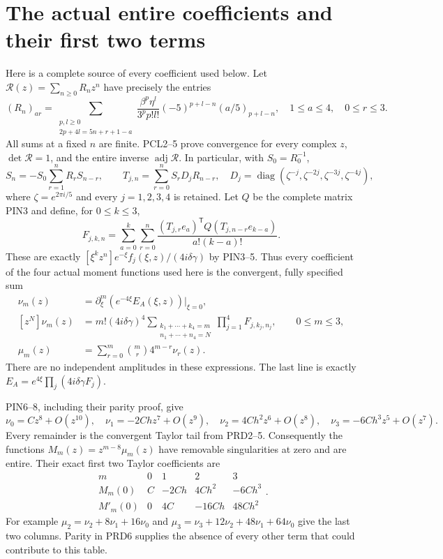 \section{The actual entire coefficients and their first two terms}
Here is a complete source of every coefficient used below. Let
$\mathcal R(z)=\sum_{n\ge0}R_nz^n$ have precisely the entries
\[
 (R_n)_{a r}=
 \sum_{\substack{p,l\ge0\\2p+4l=5n+r+1-a}}
 \frac{\beta^p\eta^l}{3^p p!l!}
 (-5)^{p+l-n}(a/5)_{p+l-n},
 \quad 1\le a\le4,\quad0\le r\le3.
 \tag{PRD2}
\]
All sums at a fixed $n$ are finite. PCL2--5 prove convergence
for every complex $z$, $\det\mathcal R=1$, and the entire
inverse $\operatorname{adj}\mathcal R$. In particular, with
$S_0=R_0^{-1}$,
\[
 S_n=-S_0\sum_{r=1}^nR_rS_{n-r},\qquad
 T_{j,n}=\sum_{r=0}^nS_rD_jR_{n-r},\quad
 D_j=\operatorname{diag}(\zeta^{-j},\zeta^{-2j},
                           \zeta^{-3j},\zeta^{-4j}),
 \tag{PRD3}
\]
where $\zeta=e^{2\pi i/5}$ and every $j=1,2,3,4$ is retained.
Let $Q$ be the complete matrix PIN3 and define, for $0\le k\le3$,
\[
 F_{j,k,n}=
 \sum_{a=0}^k\sum_{r=0}^n
 \frac{(T_{j,r}e_a)^{\mathsf T}Q(T_{j,n-r}e_{k-a})}
 {a!(k-a)!}.
 \tag{PRD4}
\]
These are exactly $[\xi^kz^n]e^{-\xi}f_j(\xi,z)/(4i\delta\gamma)$
by PIN3--5. Thus every coefficient of the four actual moment
functions used here is the convergent, fully specified sum
\[
\begin{split}
 \nu_m(z)&=\partial_\xi^m(e^{-4\xi}E_A(\xi,z))\big|_{\xi=0},\\
 [z^N]\nu_m(z)&=m!(4i\delta\gamma)^4
 \sum_{\substack{k_1+\cdots+k_4=m\\n_1+\cdots+n_4=N}}
          \prod_{j=1}^4F_{j,k_j,n_j},\qquad0\le m\le3,\\
 \mu_m(z)&=\sum_{r=0}^m\binom mr4^{m-r}\nu_r(z).
\end{split}\tag{PRD5}
\]
There are no independent amplitudes in these expressions.
The last line is exactly $E_A=e^{4\xi}\prod_j(4i\delta\gamma F_j)$.

PIN6--8, including their parity proof, give
\[
 \nu_0=Cz^8+O(z^{10}),\quad
 \nu_1=-2Chz^7+O(z^9),\quad
 \nu_2=4Ch^2z^6+O(z^8),\quad
 \nu_3=-6Ch^3z^5+O(z^7).
 \tag{PRD6}
\]
Every remainder is the convergent Taylor tail from PRD2--5.
Consequently the functions $M_m(z)=z^{m-8}\mu_m(z)$ have
removable singularities at zero and are entire. Their exact first
two Taylor coefficients are
\[
\begin{array}{c|rrrr}
 m&0&1&2&3\\\hline
 M_m(0)&C&-2Ch&4Ch^2&-6Ch^3\\
 M'_m(0)&0&4C&-16Ch&48Ch^2
\end{array}.
\tag{PRD7}
\]
For example $\mu_2=\nu_2+8\nu_1+16\nu_0$ and
$\mu_3=\nu_3+12\nu_2+48\nu_1+64\nu_0$ give the last
two columns. Parity in PRD6 supplies the absence of every other
term that could contribute to this table.

